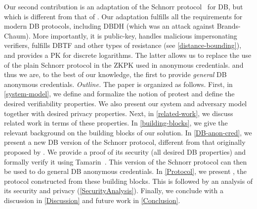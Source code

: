 Our second contribution is an adaptation of the Schnorr protocol~\cite{Schnorr} 
for \ac{DB}, but which is different from that of \textcite{DistanceBounding}.
Our adaptation fulfills all the requirements for modern \ac{DB} protocols, including \ac{DBDH} (which was an attack against Brands-Chaum).
More importantly, it is public-key, handles malicious impersonating verifiers, fulfills \ac{DBTF} and other types of resistance (see \cref{distance-bounding}), and provides a \ac{PK} for discrete logarithms.
The latter allows us to replace the use of the plain Schnorr protocol in the \ac{ZKPK} used in anonymous credentials.
and thus we are, to the best of our knowledge, the first to provide \emph{general} \ac{DB} anonymous credentials.
\emph{Outline.} 
The paper is organized as follows.
First, in \cref{system-model}, we define and formalize the notion of protest 
and define the desired verifiability properties.
We also present our system and adversary model together with desired privacy 
properties.
Next, in \cref{related-work}, we discuss related work in terms of these 
properties.
In \cref{building-blocks}, we give the relevant background on the building 
blocks of our solution.
In \cref{DB-anon-cred}, we present a new \ac{DB} version of the Schnorr 
protocol, different from that originally proposed by 
\textcite{DistanceBounding}.
We provide a proof of its security (all desired \ac{DB} properties) 
 and formally verify it 
using Tamarin~\cite{TamarinDB}.
This version of the Schnorr protocol can then be used to do general \ac{DB} 
anonymous credentials.
In \cref{Protocol}, we present \PRIVO, the protocol constructed from these 
building blocks.
This is followed by an analysis of its security and privacy 
(\cref{SecurityAnalysis}).
Finally, we conclude with a discussion in \cref{Discussion} and future work in 
\cref{Conclusion}.
